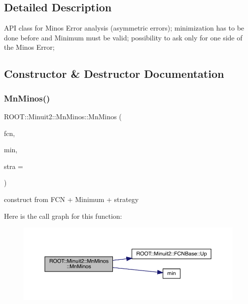 \subsection{Detailed Description}
A\+PI class for Minos Error analysis (asymmetric errors); minimization has to be done before and Minimum must be valid; possibility to ask only for one side of the Minos Error; 

\subsection{Constructor \& Destructor Documentation}
\mbox{\label{classROOT_1_1Minuit2_1_1MnMinos_ac64ec75423efa6e473ee722f08f47eb4}} 
\subsubsection{\texorpdfstring{MnMinos()}{MnMinos()}\hspace{0.1cm}{\footnotesize\ttfamily [1/4]}}
{\footnotesize\ttfamily R\+O\+O\+T\+::\+Minuit2\+::\+Mn\+Minos\+::\+Mn\+Minos (\begin{DoxyParamCaption}\item[{const \mbox{\hyperlink{classROOT_1_1Minuit2_1_1FCNBase}{F\+C\+N\+Base}} \&}]{fcn,  }\item[{const \mbox{\hyperlink{classROOT_1_1Minuit2_1_1FunctionMinimum}{Function\+Minimum}} \&}]{min,  }\item[{unsigned int}]{stra = {} }\end{DoxyParamCaption})}



construct from F\+CN + Minimum + strategy 

Here is the call graph for this function\+:\nopagebreak
\begin{figure}[H]
\begin{center}
\leavevmode
\includegraphics[width=350pt]{dc/d91/classROOT_1_1Minuit2_1_1MnMinos_ac64ec75423efa6e473ee722f08f47eb4_cgraph}
\end{center}
\end{figure}
\mbox{\label{classROOT_1_1Minuit2_1_1MnMinos_a80f912ade0dd48d937bc04b14e28623c}} 
